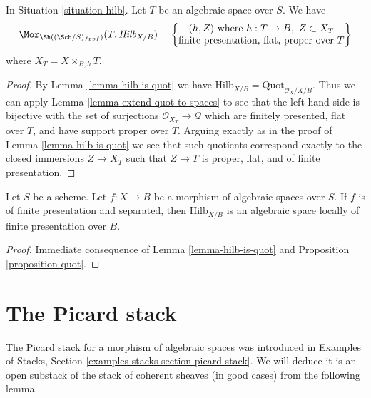 \begin{lemma}
\label{lemma-extend-hilb-to-spaces}
In Situation \ref{situation-hilb}. Let $T$ be an algebraic space over $S$.
We have
$$
\Mor_{\Sh((\Sch/S)_{fppf})}(T, \mathit{Hilb}_{X/B}) =
\left\{
\begin{matrix}
(h, Z)\text{ where }h : T \to B,\ Z \subset X_T \\
\text{finite presentation, flat, proper over }T
\end{matrix}
\right\}
$$
where $X_T = X \times_{B, h} T$.
\end{lemma}

\begin{proof}
By Lemma \ref{lemma-hilb-is-quot}
we have $\text{Hilb}_{X/B} = \text{Quot}_{\mathcal{O}_X/X/B}$.
Thus we can apply Lemma \ref{lemma-extend-quot-to-spaces}
to see that the left hand side is bijective with the set
of surjections $\mathcal{O}_{X_T} \to \mathcal{Q}$
which are finitely presented, flat over $T$, and
have support proper over $T$. Arguing exactly as in the
proof of Lemma \ref{lemma-hilb-is-quot}
we see that such quotients correspond
exactly to the closed immersions $Z \to X_T$ such that
$Z \to T$ is proper, flat, and of finite presentation.
\end{proof}

\begin{proposition}
\label{proposition-hilb}
Let $S$ be a scheme. Let $f : X \to B$ be a morphism of algebraic
spaces over $S$. If $f$ is of finite presentation and separated, then
$\text{Hilb}_{X/B}$ is an algebraic space locally of finite
presentation over $B$.
\end{proposition}

\begin{proof}
Immediate consequence of
Lemma \ref{lemma-hilb-is-quot}
and Proposition \ref{proposition-quot}.
\end{proof}






\section{The Picard stack}
\label{section-picard-stack}

\noindent
The Picard stack for a morphism of algebraic spaces was introduced
in Examples of Stacks, Section \ref{examples-stacks-section-picard-stack}.
We will deduce it is an open substack of the stack of coherent sheaves
(in good cases) from the following lemma.

